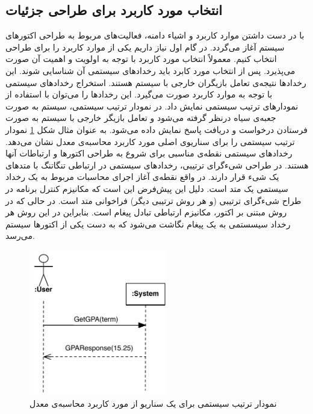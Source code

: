 \subsection{انتخاب مورد کاربرد برای طراحی جزئیات}
با در دست داشتن موارد کاربرد و اشیاء دامنه، فعالیت‌های مربوط به طراحی اکتورهای سیستم آغاز می‌گردد. در گام اول نیاز داریم یکی از موارد کاربرد را برای طراحی انتخاب کنیم. معمولاً انتخاب مورد کاربرد با توجه به اولویت و اهمیت‌ آن صورت می‌پذیرد. پس از انتخاب مورد کابرد باید رخداد‌های سیستمی آن شناسایی شوند. این رخدادها نتیجه‌ی تعامل بازیگران خارجی با سیستم هستند. استخراج رخداد‌های سیستمی با توجه به موارد کاربرد صورت می‌گیرد. این رخدادها را می‌توان با استفاده از نمودارهای ترتیب سیستمی نمایش داد\cite{Larman_2004}. در نمودار ترتیب سیستمی، سیستم به صورت جعبه‌ی سیاه درنظر گرفته می‌شود و تعامل بازیگر خارجی با سیستم به صورت فرستادن درخواست و دریافت پاسخ نمایش داده می‌شود. 
به عنوان مثال شکل \ref{fig:ssd} نمودار ترتیب سیستمی را برای سناریوی اصلی مورد کاربرد محاسبه‌ی معدل نشان می‌دهد. رخدادهای سیستمی نقطه‌ی مناسبی برای شروع به طراحی اکتورها و ارتباطات آنها هستند. در طراحی شیءگرای ترتیبی، رخدادهای سیستمی در ارتباطی تنگاتنگ با متدهای یک شیء قرار دارند. در واقع نقطه‌ی آغاز اجرای محاسبات مربوط به یک رخداد سیستمی یک متد است. دلیل این پیش‌فرض این است که مکانیزم کنترل برنامه در طراح شیءگرای ترتیبی (و هر روش ترتیبی دیگر) فراخوانی متد است. در حالی که در روش مبتنی بر اکتور، مکانیزم ارتباطی تبادل پیغام است. بنابراین در این روش هر رخداد سیسستمی به یک پیغام نگاشت می‌شود که به دست یکی از اکتورها سیستم می‌رسد. 
\begin{figure}[bh]
    \begin{center}
	\includegraphics[width=6cm]{4-ProposedFramework/Figures/ssd.pdf}
    \end{center}
    \caption{\label{fig:ssd}نمودار ترتیب سیستمی برای یک سناریو از مورد کاربرد محاسبه‌ی معدل}
\end{figure}

